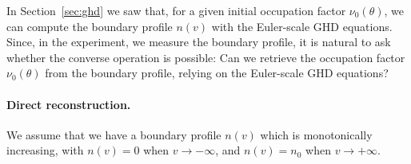 In Section~\ref{sec:ghd} we saw that, for a given initial occupation factor $\nu_0(\theta)$, we can compute the boundary profile $n(v)$ with the Euler-scale GHD equations. Since, in the experiment, we measure the boundary profile, it is natural to ask whether the converse operation is possible: Can we retrieve the occupation factor $\nu_0(\theta)$ from the boundary profile, relying on the Euler-scale GHD equations?


\paragraph{Direct reconstruction.}


We assume that we have a boundary profile $n(v)$ which is monotonically increasing, with $n(v) = 0$ when $v \rightarrow -\infty$, and $n(v) = n_0$ when $v \rightarrow +\infty$. 

